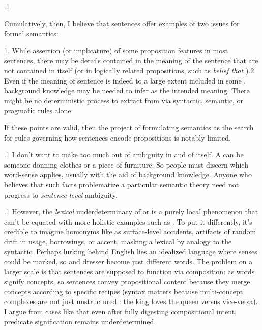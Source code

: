 \documentclass[11pt, twocolumn]{article}
\begin{document}
\p.1{%
Cumulatively, then, I believe that sentences \onethrft{} offer examples
of two issues for formal semantics: \vspace{5pt}

\begin{docEnumerate}
1. While assertion (or implicature) of some proposition 
features in most sentences, there may be details contained in
the meaning of the sentence that are not contained in  itself
(or in logically related propositions, such as \textit{belief that }).2. Even if the meaning of sentence  is indeed to a large extent included in some
, background knowledge may be needed to infer  as the intended
meaning. There might be no deterministic process to extract  from
 via syntactic, semantic, or pragmatic rules alone.

\end{docEnumerate}

\nip{}%
If these points are valid, then the project of formulating semantics as the search
for rules governing how sentences  encode propositions  is notably limited.
}%

\p.1{%
I don't want to make too much out of ambiguity in and of itself.
A  can be someone donning clothes or a piece of furniture.
So people must discern which word-sense applies, usually with the aid of background knowledge.
Anyone who believes that such facts problematize a particular semantic theory
need not progress to \textit{sentence-level} ambiguity.
}%

\p.1{%
However, the \textit{lexical} underdeterminacy of  or 
is a purely local phenomenon that can't be equated with more holistic
examples such as \onethrn{}. To put it differently,
it's credible to imagine homonyms like 
as surface-level accidents, artifacts of random drift in usage, borrowings, or
accent, masking a lexical
 by analogy to the syntactic.
Perhaps lurking behind English lies an idealized language where senses
could be marked, so  and  dresser become just
different words. The problem on a larger scale is that sentences are supposed to
function via composition: as words signify concepts, so sentences
convey propositional content because they merge concepts according
to specific recipes (syntax matters because multi-concept complexes
are not just unstructured : the king loves the queen versus vice-versa).
I argue from cases like \onethrft{} that even after fully digesting
compositional intent, predicate signification remains underdetermined.
}%
\end{document}
